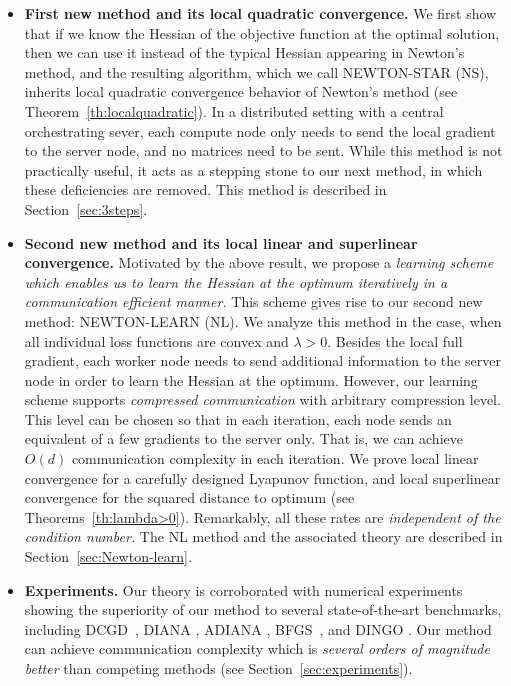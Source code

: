 \documentclass[12pt]{article}
\begin{document}
\begin{itemize}
\item {\bf First new method and its local quadratic convergence.} We first show that if we know the Hessian of the objective function at   the optimal solution, then we can use it instead of the typical Hessian appearing in Newton's method, and the resulting algorithm, which we call {\sf NEWTON-STAR (NS)}, inherits  local quadratic convergence behavior of Newton's method (see Theorem~\ref{th:localquadratic}). In a distributed setting with a central orchestrating sever, each compute node only needs to send the local  gradient  to the server  node, and no matrices need to be sent. While this method is not practically useful, it acts as a stepping stone to our next method, in which these deficiencies are removed. This method is described in Section~\ref{sec:3steps}. 

\item  {\bf Second new method and its local linear and superlinear convergence.} Motivated by the above result, we propose a {\em learning scheme which enables us to learn the Hessian at the optimum iteratively  in a communication efficient manner.} This scheme gives rise to our second new method: {\sf NEWTON-LEARN (NL)}. We analyze this method in the case, when all individual loss functions are convex and $\lambda >0$. Besides the local full gradient, each worker node needs to send additional information to the server node in order to learn the Hessian at the optimum. However, our learning  scheme supports {\em compressed communication} with arbitrary compression level. This level can be chosen so that in each iteration, each node sends an equivalent of a few gradients to the server only. That is, we can achieve $O(d)$ communication complexity in each iteration. We prove local linear convergence for a carefully designed Lyapunov function, and  local superlinear convergence for the squared distance to optimum (see Theorems~\ref{th:lambda>0}). Remarkably, all these rates are {\em independent of the condition number.} The {\sf NL} method and the associated theory are described in Section~\ref{sec:Newton-learn}.


\item {\bf Experiments.} Our theory is corroborated with numerical experiments showing the superiority of our method to several state-of-the-art benchmarks, including DCGD~\citep{KFJ}, DIANA \citep{DIANA, DIANA2}, ADIANA \citep{ADIANA}, BFGS~\cite{Broyden1967, Fletcher1970, Goldfarb1970, shanno1970conditioning}, and DINGO \citep{DINGO2019}.  Our method can achieve communication complexity which is {\em several orders of magnitude better} than  competing methods (see Section~\ref{sec:experiments}).
\end{itemize}
\end{document}
